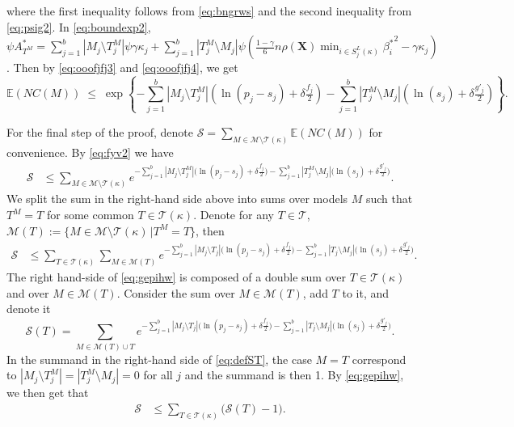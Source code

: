 \documentclass[bj,authoryear]{imsart}
\theoremstyle{plain}
\newcommand{\E}{\mathbb{E}}
\newcommand{\M}{\mathcal{M}}
\newcommand{\T}{\mathcal{T}}
\newcommand{\bs}{\boldsymbol}
\begin{document}
where the first inequality follows from \eqref{eq:bngrws} and the second inequality from \eqref{eq:psig2}. In \eqref{eq:boundexp2}, $\psi A^*_{T^M}=\sum_{j=1}^b|M_j \setminus T^M_j|\psi\gamma\kappa_j + \sum_{j=1}^b |T^M_j \setminus M_j|\psi\left(\tfrac{1-\gamma}{6} n \rho(\bs X) \min_{i\in S^{L}_j(\kappa)}{\beta^*_i}^{2} - \gamma\kappa_j\right)$. Then by \eqref{eq:ooofjfj3} and \eqref{eq:ooofjfj4}, we get
\begin{equation}\label{eq:fyv2}
\E(NC(M))\;\leq\;\exp\left\{- \sum_{j=1}^b |M_j\setminus T^M_j|(\ln(p_j-s_j)+\delta \tfrac{f_j}{2})-\sum_{j=1}^b |T^M_j\setminus M_j|(\ln(s_j)+\delta \tfrac{g'_j}{2})\right\}.
\end{equation}

For the final step of the proof, denote $\mathcal{S}= \sum_{M \in \M\setminus \T(\kappa)} \E\left(NC(M)\right)$ for convenience. By \eqref{eq:fyv2} we have
\begin{align*}
    \mathcal{S} &\leq \sum_{M \in \M\setminus \T(\kappa)}e^{- \sum_{j=1}^b |M_j\setminus T^M_j|\big(\ln(p_j-s_j)+\delta \tfrac{f_j}{2}\big)-\sum_{j=1}^b |T^M_j\setminus M_j|\big(\ln(s_j)+\delta \tfrac{g'_j}{2}\big)}.
\end{align*}
We split the sum in the right-hand side above into sums over models $M$ %
such that $T^M=T$ for some common $T\in \T(\kappa)$. Denote for any $T\in \T$,\, $\M(T):=\{M \in \M\setminus \T(\kappa) \,| T^M=T\}$, then
\begin{align}\label{eq:gepihw}
    \mathcal{S} &\leq \sum_{T \in \T(\kappa)}\sum_{M \in \M(T)}e^{- \sum_{j=1}^b |M_j\setminus T_j|\big(\ln(p_j-s_j)+\delta \tfrac{f_j}{2}\big)-\sum_{j=1}^b |T_j\setminus M_j|\big(\ln(s_j)+\delta \tfrac{g'_j}{2}\big)}.
\end{align}
The right hand-side of \eqref{eq:gepihw} is composed of a double sum over $T \in \T(\kappa)$ and over $M \in \M(T)$. Consider the sum over $M \in \M(T)$, add $T$ to it, and denote it
\begin{equation}\label{eq:defST}
  \mathcal{S}(T)=\sum_{M \in \M(T) \cup T}e^{- \sum_{j=1}^b |M_j\setminus T_j|\big(\ln(p_j-s_j)+\delta \tfrac{f_j}{2}\big)-\sum_{j=1}^b |T_j\setminus M_j|\big(\ln(s_j)+\delta \tfrac{g'_j}{2}\big)}.
\end{equation}
In the summand in the right-hand side of \eqref{eq:defST}, the case $M=T$ correspond to $|M_j\setminus T^M_j|=|T^M_j\setminus M_j|=0$ for all $j$ and the summand is then 1.
By \eqref{eq:gepihw}, we then get that
\begin{align}\label{eq:gepihw2}
    \mathcal{S} &\leq \sum_{T \in \T(\kappa)}\big(\mathcal{S}(T)-1\big).
\end{align}
\end{document}
